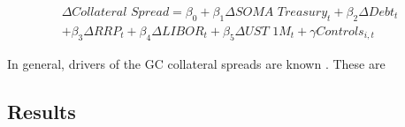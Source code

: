 \documentclass[11pt,a4paper,english,oneside]{article}
\begin{document}
\begin{equation} \label{eq:2}
  \begin{gathered}
  \Delta \textit{Collateral Spread} = \beta_0 + \beta_1 \Delta \textit{SOMA Treasury}_t + \beta_2 \Delta \textit{Debt}_t \\ + \beta_3 \Delta \textit{RRP}_t + \beta_4 \Delta \textit{LIBOR}_t + \beta_5 \Delta \textit{UST 1M}_t + \gamma \textit{Controls}_{i,t}
  \end{gathered}
\end{equation}

In general, drivers of the GC collateral spreads are known \citet{nyborg2019a}. These are









\subsection{Results} %
\end{document}
